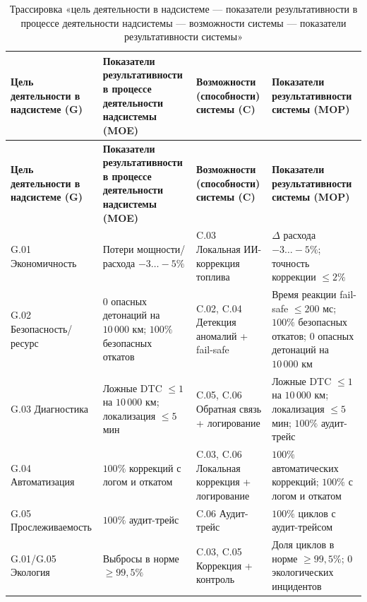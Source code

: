 \documentclass[14pt, a4paper]{extarticle}
\begin{document}
			{\fontsize{9}{11}\selectfont
				\begin{xltabular}{\textwidth}{|L|L|L|L|}
				\caption{Трассировка «цель деятельности в надсистеме — показатели результативности в процессе деятельности надсистемы — возможности системы — показатели результативности системы»}\label{tab:trace-perf}\\
				\hline
				\textbf{Цель деятельности в надсистеме (G)} & \textbf{Показатели результативности в процессе деятельности надсистемы (MOE)} & \textbf{Возможности (способности) системы (C)} & \textbf{Показатели результативности системы (MOP)} \\
				\hline
				\endfirsthead
				\hline
				\textbf{Цель деятельности в надсистеме (G)} & \textbf{Показатели результативности в процессе деятельности надсистемы (MOE)} & \textbf{Возможности (способности) системы (C)} & \textbf{Показатели результативности системы (MOP)} \\
				\hline
				\endhead
				\hline
				\endfoot
				\hline
				\endlastfoot
				G.01 Экономичность & Потери мощности/расхода \(-3\ldots-5\%\) & C.03 Локальная ИИ-коррекция топлива & \(\Delta\) расхода \(-3\ldots-5\%\); точность коррекции \(\leq 2\%\) \\
				\hline
				G.02 Безопасность/ресурс & \(0\) опасных детонаций на \(10\,000\) км; \(100\%\) безопасных откатов & C.02, C.04 Детекция аномалий + fail-safe & Время реакции fail-safe \(\leq 200\) мс; \(100\%\) безопасных откатов; \(0\) опасных детонаций на \(10\,000\) км \\
				\hline
				G.03 Диагностика & Ложные DTC \(\leq 1\) на \(10\,000\) км; локализация \(\leq 5\) мин & C.05, C.06 Обратная связь + логирование & Ложные DTC \(\leq 1\) на \(10\,000\) км; локализация \(\leq 5\) мин; \(100\%\) аудит-трейс \\
				\hline
				G.04 Автоматизация & \(100\%\) коррекций с логом и откатом & C.03, C.06 Локальная коррекция + логирование & \(100\%\) автоматических коррекций; \(100\%\) с логом и откатом \\
				\hline
				G.05 Прослеживаемость & \(100\%\) аудит-трейс & C.06 Аудит-трейс & \(100\%\) циклов с аудит-трейсом \\
				\hline
				G.01/G.05 Экология & Выбросы в норме \(\geq 99{,}5\%\) & C.03, C.05 Коррекция + контроль & Доля циклов в норме \(\geq 99{,}5\%\); \(0\) экологических инцидентов \\
				\hline
			\end{xltabular}}
					
			
			
\end{document}
